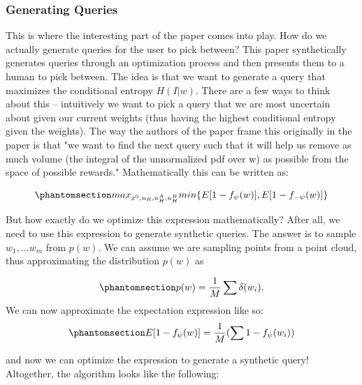 \documentclass[
  letterpaper,
  numbers=noenddot,
  DIV=11]{scrreprt}
\theoremstyle{plain}
\theoremstyle{definition}
\theoremstyle{plain}
\theoremstyle{remark}
\begin{document}
\subsubsection*{Generating Queries}\label{generating-queries}

This is where the interesting part of the paper comes into play. How do
we actually generate queries for the user to pick between? This paper
synthetically generates queries through an optimization process and then
presents them to a human to pick between. The idea is that we want to
generate a query that maximizes the conditional entropy \(H(I|w)\).
There are a few ways to think about this -- intuitively we want to pick
a query that we are most uncertain about given our current weights (thus
having the highest conditional entropy given the weights). The way the
authors of the paper frame this originally in the paper is that "we want
to find the next query such that it will help us remove as much volume
(the integral of the unnormalized pdf over w) as possible from the space
of possible rewards." Mathematically this can be written as:

\begin{equation}\phantomsection\label{eq-eq3.41}{max_{x^0, u_R, u_H^A, u_H^B} min\{E[1-f_{\psi}(w)], E[1 - f_{-\psi}(w)]\}}\end{equation}

But how exactly do we optimize this expression mathematically? After
all, we need to use this expression to generate synthetic queries. The
answer is to sample \(w_1, ... w_m\) from \(p(w)\). We can assume we are
sampling points from a point cloud, thus approximating the distribution
\(p(w)\) as

\begin{equation}\phantomsection\label{eq-eq3.42}{p(w) = \frac{1}{M} \sum \delta (w_i).}\end{equation}
We can now approximate the expectation expression like so:
\begin{equation}\phantomsection\label{eq-eq3.43}{E[1 - f_{\psi}(w)] = \frac{1}{M} (\sum 1 - f_{\psi}(w_i))}\end{equation}

and now we can optimize the expression to generate a synthetic query!
Altogether, the algorithm looks like the following:
\end{document}
